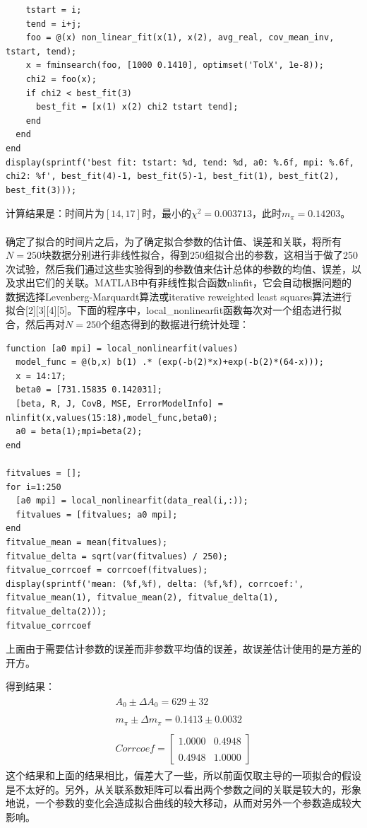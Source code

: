 \documentclass[paper=a4, fontsize=11pt]{scrartcl} %
\numberwithin{equation}{section} %
\numberwithin{figure}{section} %
\numberwithin{table}{section} %
\begin{document}
\begin{CJK*}{UTF8}{gbsn}
\begin{lstlisting}
    tstart = i;
    tend = i+j;
    foo = @(x) non_linear_fit(x(1), x(2), avg_real, cov_mean_inv, tstart, tend);
    x = fminsearch(foo, [1000 0.1410], optimset('TolX', 1e-8));
    chi2 = foo(x);
    if chi2 < best_fit(3)
      best_fit = [x(1) x(2) chi2 tstart tend];
    end
  end
end
display(sprintf('best fit: tstart: %d, tend: %d, a0: %.6f, mpi: %.6f, chi2: %f', best_fit(4)-1, best_fit(5)-1, best_fit(1), best_fit(2), best_fit(3)));
\end{lstlisting}
计算结果是：时间片为$[14,17]$时，最小的$\chi^2=0.003713$，此时$m_\pi=0.14203$。
\\\\
确定了拟合的时间片之后，为了确定拟合参数的估计值、误差和关联，将所有$N=250$块数据分别进行非线性拟合，得到250组拟合出的参数，这相当于做了250次试验，然后我们通过这些实验得到的参数值来估计总体的参数的均值、误差，以及求出它们的关联。MATLAB中有非线性拟合函数nlinfit，它会自动根据问题的数据选择Levenberg-Marquardt算法或iterative reweighted least squares算法进行拟合[2][3][4][5]。下面的程序中，local\_nonlinearfit函数每次对一个组态进行拟合，然后再对$N=250$个组态得到的数据进行统计处理：
\begin{lstlisting}
function [a0 mpi] = local_nonlinearfit(values)
  model_func = @(b,x) b(1) .* (exp(-b(2)*x)+exp(-b(2)*(64-x)));
  x = 14:17;
  beta0 = [731.15835 0.142031];
  [beta, R, J, CovB, MSE, ErrorModelInfo] = nlinfit(x,values(15:18),model_func,beta0);
  a0 = beta(1);mpi=beta(2);
end

fitvalues = [];
for i=1:250
  [a0 mpi] = local_nonlinearfit(data_real(i,:));
  fitvalues = [fitvalues; a0 mpi];
end
fitvalue_mean = mean(fitvalues);
fitvalue_delta = sqrt(var(fitvalues) / 250);
fitvalue_corrcoef = corrcoef(fitvalues);
display(sprintf('mean: (%f,%f), delta: (%f,%f), corrcoef:', fitvalue_mean(1), fitvalue_mean(2), fitvalue_delta(1), fitvalue_delta(2)));
fitvalue_corrcoef
\end{lstlisting}
上面由于需要估计参数的误差而非参数平均值的误差，故误差估计使用的是方差的开方。

得到结果：
\begin{align}
\begin{split}
A_0\pm \Delta A_0 = 629 \pm 32 \\\\
m_\pi \pm \Delta m_\pi = 0.1413 \pm 0.0032 \\\\
Corrcoef = \begin{bmatrix} 1.0000 & 0.4948 \\\\ 0.4948 & 1.0000 \end{bmatrix}
\end{split}
\end{align}
这个结果和上面的结果相比，偏差大了一些，所以前面仅取主导的一项拟合的假设是不太好的。另外，从关联系数矩阵可以看出两个参数之间的关联是较大的，形象地说，一个参数的变化会造成拟合曲线的较大移动，从而对另外一个参数造成较大影响。
\\\\
\\\\

\end{CJK*}
\end{document}
